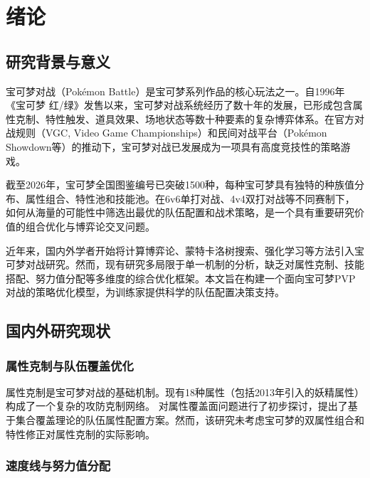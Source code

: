 \chapter{绪论}\label{chap:introduction}

\section{研究背景与意义}

宝可梦对战（Pokémon Battle）是宝可梦系列作品的核心玩法之一。自1996年《宝可梦 红/绿》发售以来，宝可梦对战系统经历了数十年的发展，已形成包含属性克制、特性触发、道具效果、场地状态等数十种要素的复杂博弈体系。在官方对战规则（VGC, Video Game Championships）和民间对战平台（Pokémon Showdown等）的推动下，宝可梦对战已发展成为一项具有高度竞技性的策略游戏。

截至2026年，宝可梦全国图鉴编号已突破1500种，每种宝可梦具有独特的种族值分布、属性组合、特性池和技能池。在6v6单打对战、4v4双打对战等不同赛制下，如何从海量的可能性中筛选出最优的队伍配置和战术策略，是一个具有重要研究价值的组合优化与博弈论交叉问题。

近年来，国内外学者开始将计算博弈论、蒙特卡洛树搜索、强化学习等方法引入宝可梦对战研究\citep{lamport1986document,walls2013drought}。然而，现有研究多局限于单一机制的分析，缺乏对属性克制、技能搭配、努力值分配等多维度的综合优化框架。本文旨在构建一个面向宝可梦PVP对战的策略优化模型，为训练家提供科学的队伍配置决策支持。

\section{国内外研究现状}

\subsection{属性克制与队伍覆盖优化}

属性克制是宝可梦对战的基础机制。现有18种属性（包括2013年引入的妖精属性）构成了一个复杂的攻防克制网络。\citet{chen1980zhongguo} 对属性覆盖面问题进行了初步探讨，提出了基于集合覆盖理论的队伍属性配置方案。然而，该研究未考虑宝可梦的双属性组合和特性修正对属性克制的实际影响。

\subsection{速度线与努力值分配}


